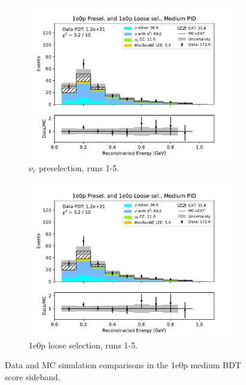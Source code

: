 \begin{figure}[H]
\begin{subfigure}{0.5\linewidth}
        \includegraphics[width=\linewidth]{technote/Sidebands/Figures/NearSideband/near_sideband_reco_e_run1234a4b4c4d5_ZP_ZPLOOSESEL_MEDIUM_PID.pdf}
        \caption{$\nu_e$ preselection, runs 1-5.}
    \end{subfigure}%
    \begin{subfigure}{0.5\linewidth}
        \includegraphics[width=\linewidth]{technote/Sidebands/Figures/NearSideband/near_sideband_reco_e_run1234a4b4c4d5_ZP_ZPLOOSESEL_MEDIUM_PID.pdf}
        \caption{1e0p loose selection, runs 1-5.}
    \end{subfigure}
    \caption{Data and MC simulation comparisons in the 1e0p medium BDT score sideband.}
\end{figure}

